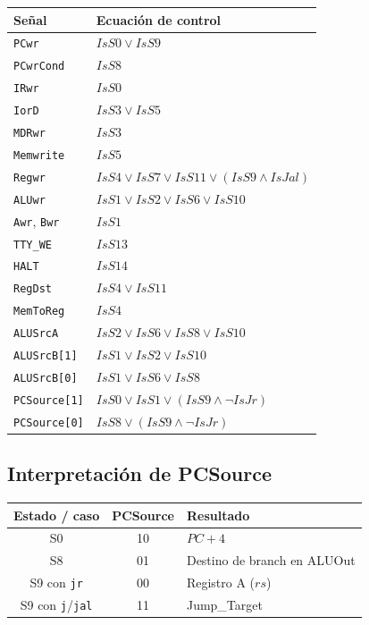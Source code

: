 \documentclass[11pt,a4paper]{article}
\begin{document}
\begin{longtable}{@{}lp{10cm}@{}}
\toprule
\textbf{Señal} & \textbf{Ecuación de control} \\
\midrule
\texttt{PCwr} & $IsS0 \lor IsS9$ \\
\texttt{PCwrCond} & $IsS8$ \\
\texttt{IRwr} & $IsS0$ \\
\texttt{IorD} & $IsS3 \lor IsS5$ \\
\texttt{MDRwr} & $IsS3$ \\
\texttt{Memwrite} & $IsS5$ \\
\texttt{Regwr} & $IsS4 \lor IsS7 \lor IsS11 \lor (IsS9\land IsJal)$ \\
\texttt{ALUwr} & $IsS1 \lor IsS2 \lor IsS6 \lor IsS10$ \\
\texttt{Awr}, \texttt{Bwr} & $IsS1$ \\
\texttt{TTY\_WE} & $IsS13$ \\
\texttt{HALT} & $IsS14$ \\
\texttt{RegDst} & $IsS4 \lor IsS11$ \\
\texttt{MemToReg} & $IsS4$ \\
\texttt{ALUSrcA} & $IsS2 \lor IsS6 \lor IsS8 \lor IsS10$ \\
\texttt{ALUSrcB[1]} & $IsS1 \lor IsS2 \lor IsS10$ \\
\texttt{ALUSrcB[0]} & $IsS1 \lor IsS6 \lor IsS8$ \\
\texttt{PCSource[1]} & $IsS0 \lor IsS1 \lor (IsS9\land\neg IsJr)$ \\
\texttt{PCSource[0]} & $IsS8 \lor (IsS9\land\neg IsJr)$ \\
\bottomrule
\end{longtable}

\subsection{Interpretación de PCSource}

\begin{center}
\begin{tabular}{ccl}
\toprule
\textbf{Estado / caso} & \textbf{PCSource} & \textbf{Resultado} \\
\midrule
S0 & 10 & $PC+4$ \\
S8 & 01 & Destino de branch en ALUOut \\
S9 con \texttt{jr} & 00 & Registro A ($rs$) \\
S9 con \texttt{j}/\texttt{jal} & 11 & Jump\_Target \\
\bottomrule
\end{tabular}
\end{center}
\end{document}
